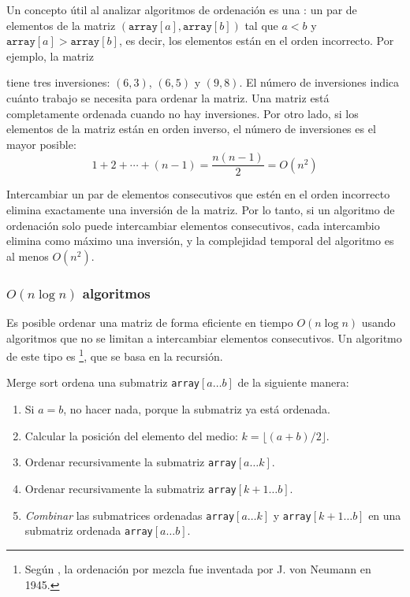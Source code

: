 Un concepto útil al analizar algoritmos de ordenación es una :
un par de elementos de la matriz
$(\texttt{array}[a],\texttt{array}[b])$ tal que
$a<b$ y $\texttt{array}[a]>\texttt{array}[b]$,
es decir, los elementos están en el orden incorrecto.
Por ejemplo, la matriz
\begin{center}
\end{center}
tiene tres inversiones: $(6,3)$, $(6,5)$ y $(9,8)$.
El número de inversiones indica
cuánto trabajo se necesita para ordenar la matriz.
Una matriz está completamente ordenada cuando
no hay inversiones.
Por otro lado, si los elementos de la matriz
están en orden inverso,
el número de inversiones es el mayor posible:
\[1+2+\cdots+(n-1)=\frac{n(n-1)}{2} = O(n^2)\]

Intercambiar un par de elementos consecutivos que estén
en el orden incorrecto elimina exactamente una inversión
de la matriz.
Por lo tanto, si un algoritmo de ordenación solo puede
intercambiar elementos consecutivos, cada intercambio elimina
como máximo una inversión, y la complejidad temporal
del algoritmo es al menos $O(n^2)$.

\subsubsection{$O(n \log n)$ algoritmos}


Es posible ordenar una matriz de forma eficiente
en tiempo $O(n \log n)$ usando algoritmos
que no se limitan a intercambiar elementos consecutivos.
Un algoritmo de este tipo es \footnote{Según \cite{knu983},
la ordenación por mezcla fue inventada por J. von Neumann en 1945.},
que se basa en la recursión.

Merge sort ordena una submatriz \texttt{array}$[a \ldots b]$ de la siguiente manera:

\begin{enumerate}
\item Si $a=b$, no hacer nada, porque la submatriz ya está ordenada.
\item Calcular la posición del elemento del medio: $k=\lfloor (a+b)/2 \rfloor$.
\item Ordenar recursivamente la submatriz \texttt{array}$[a \ldots k]$.
\item Ordenar recursivamente la submatriz \texttt{array}$[k+1 \ldots b]$.
\item \emph{Combinar} las submatrices ordenadas \texttt{array}$[a \ldots k]$ y
\texttt{array}$[k+1 \ldots b]$
en una submatriz ordenada \texttt{array}$[a \ldots b]$.
\end{enumerate}

